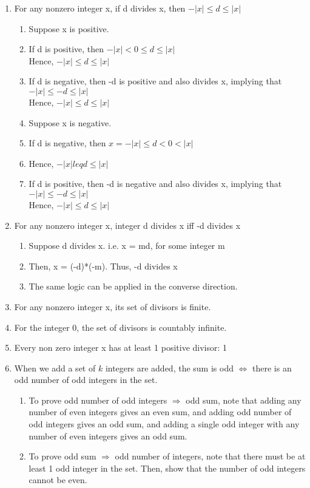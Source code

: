 \documentclass{article}
\begin{document}
\begin{enumerate}
\item For any nonzero integer x, if d divides x, then $ -|x| \leq d \leq |x| $
\begin{enumerate}
\item Suppose x is positive.
\item If d is positive, then $ -|x| < 0 \leq d \leq |x| $
\\ Hence, $ -|x| \leq d \leq |x| $
\item If d is negative, then -d is positive and also divides x, implying that $ -|x| \leq -d \leq |x| $
\\ Hence, $ -|x| \leq d \leq |x| $
\item Suppose x is negative.
\item If d is negative, then $ x = -|x| \leq d < 0 < |x| $
\item Hence, $ -|x| leq d \leq |x| $
\item If d is positive, then -d is negative and also divides x, implying that $
-|x| \leq -d \leq |x| $
\\ Hence, $ -|x| \leq d \leq |x| $
\end{enumerate}

\item For any nonzero integer x, integer d divides x iff -d divides x
\begin{enumerate}
\item Suppose d divides x. i.e. x = md, for some integer m
\item Then, x = (-d)*(-m). Thus, -d divides x
\item The same logic can be applied in the converse direction.
\end{enumerate}

\item For any nonzero integer x, its set of divisors is finite.
\item For the integer 0, the set of divisors is countably infinite.

\item Every non zero integer x has at least 1 positive divisor: 1

\item When we add a set of $k$ integers are added, the sum is odd $\iff$ there
is an odd number of odd integers in the set.
\begin{enumerate}
\item To prove odd number of odd integers $\Rightarrow$ odd sum, note that
adding any number of even integers gives an even sum, and adding odd number of odd
integers gives an odd sum, and adding a single odd integer with any number of
even integers gives an odd sum.
\item To prove odd sum $\Rightarrow$ odd number of integers, note that there
must be at least 1 odd integer in the set. Then, show that the number of odd
integers cannot be even.
\end{enumerate}

\end{enumerate}
\end{document}
